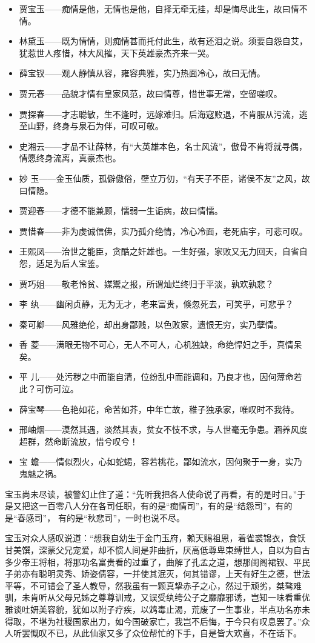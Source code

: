 \documentclass[12pt,oneside]{book}
\begin{document}
\begin{itemize}
\item 贾宝玉——痴情是他，无情也是他，自择无牵无挂，却是悔尽此生，故曰情不情。
\item 林黛玉——既为情情，则痴情甚而托付此生，故有还泪之说。须要自怨自艾，犹惹世人疼惜，林大风摧，天下英雄豪杰齐来一哭。
\item 薛宝钗——观人静慎从容，雍容典雅，实乃热面冷心，故曰无情。
\item 贾元春——品貌才情有皇家风范，故曰情尊，惜世事无常，空留嗟叹。
\item 贾探春——才志聪敏，生不逢时，远嫁难归。后海寇败退，不肯服从污流，逃至山野，终身与泉石为伴，可叹可敬。
\item 史湘云——才品不让薛林，有“大英雄本色，名士风流”，傲骨不肯将就寻偶，情愿终身流离，真豪杰也。
\item 妙  玉——金玉仙质，孤僻傲俗，壁立万仞，“有天子不臣，诸侯不友”之风，故曰情隐。
\item 贾迎春——才德不能兼顾，懦弱一生诟病，故曰情懦。
\item 贾惜春——非为虔诚信佛，实乃孤介绝情，冷心冷面，老死庙宇，可悲可叹。
\item 王熙凤——治世之能臣，贪酷之奸雄也。一生好强，家败又无力回天，自省自怨，适足为后人宝鉴。 
\item 贾巧姐——敬老怜贫、媒鬻之报，所谓灿烂终归于平淡，孰欢孰悲？
\item 李  纨——幽闲贞静，无为无才，老来富贵，倏忽死去，可笑乎，可悲乎？
\item 秦可卿——风雅绝伦，却出身鄙贱，以色败家，遗恨无穷，实乃孽情。
\item 香  菱——满眼无物不可心，无人不可人，心机独缺，命绝悍妇之手，真情呆矣。
\item 平  儿——处污秽之中而能自清，位纷乱中而能调和，乃良才也，因何薄命若此？可伤可泣。
\item 薛宝琴——色艳如花，命苦如芥，中年亡故，稚子独承家，唯叹时不我待。
\item 邢岫烟——漠然其遇，淡然其衷，贫女不忮不求，与人世毫无争患。涵养风度超群，然命断流放，惜兮叹兮！
\item 宝  蟾——情似烈火，心如蛇蝎，容若桃花，鄙如流水，因何聚于一身，实乃鬼魅之祸。
\end{itemize}


宝玉尚未尽读，被警幻止住了道：“先听我把各人使命说了再看，有的是时日。”于是又把这一百零八人分在各司任职，有的是“痴情司”，有的是“结怨司”，有的是“春感司”， 有的是“秋悲司”，一时也说不尽。

宝玉对众人感叹说道：“想我自幼生于金门玉府，赖天赐祖恩，着雀裘锦衣，食饫甘美馔，深蒙父兄宠爱，却不惯人间是非曲折，厌高低尊卑束缚世人，自以为自古多少帝王将相，将那功名富贵看的过重了，曲解了孔孟之道，想那闺阁裙钗、平民子弟亦有聪明灵秀、娇姿倩容，一并使其泯灭，何其错谬，上天有好生之德，世法平等，不可错会了圣人教导，然我虽有一颗真挚赤子之心，然过于顽劣，桀骜难驯，未肯听从父母兄姊之尊尊训戒，又误受纨绔公子之靡靡邪诱，岂知一味看重优雅谈吐妍美容貌，犹如以附子疗疾，以鸩毒止渴，荒废了一生事业，半点功名亦未得取，不堪为社稷国家出力，如今国破家亡，我岂不后悔，于今只有叹息罢了。”众人听罢慨叹不已，从此仙家又多了众位帮忙的下手，自是皆大欢喜，不在话下。
\end{document}
